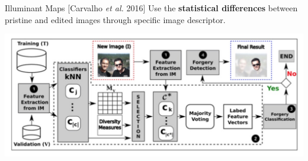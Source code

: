 \begin{tframe}{Illuminant Maps {\small [Carvalho \emph{et al.} 2016]}}
\vspace{0.1cm}
Use the \textbf{statistical differences} between pristine and edited images through specific image descriptor.\vspace{0.4cm}
\begin{center}
\includegraphics[width=\textwidth]{images/carvalho2.jpg}
\end{center}
\end{tframe}

